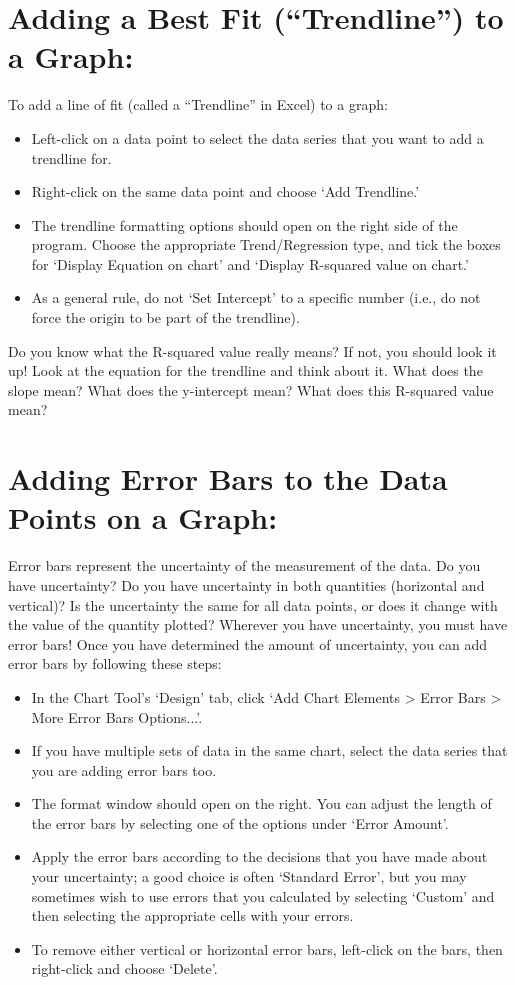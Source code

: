 \section*{Adding a Best Fit (``Trendline'') to a Graph:}
To add a line of fit (called a ``Trendline'' in Excel) to a graph:
\begin{itemize}
\itemsep-0.3em
\item Left-click on a data point to select the data series that you want to add a trendline for.
\item Right-click on the same data point and choose `Add Trendline.' 
\item The trendline formatting options should open on the right side of the program. Choose the appropriate Trend/Regression type, and tick the boxes for `Display Equation on chart' and `Display R-squared value on chart.' 
\item As a general rule, do not `Set Intercept' to a specific number (i.e., do not force the origin to be part of the trendline). 
\end{itemize}
Do you know what the R-squared value really means? 
If not, you should look it up! 
Look at the equation for the trendline and think about it. 
What does the slope mean? 
What does the y-intercept mean? What does this R-squared value mean?

\section*{Adding Error Bars to the Data Points on a Graph:}
Error bars represent the uncertainty of the measurement of the data. 
Do you have uncertainty? 
Do you have uncertainty in both quantities (horizontal and vertical)? 
Is the uncertainty the same for all data points, or does it change with the value of the quantity plotted? 
Wherever you have uncertainty, you must have error bars! 
Once you have determined the amount of uncertainty, you can add error bars by following these steps:
\begin{itemize}
\itemsep-0.3em
\item In the Chart Tool's `Design' tab, click `Add Chart Elements > Error Bars > More Error Bars Options...'. 
\item If you have multiple sets of data in the same chart, select the data series that you are adding error bars too.
\item The format window should open on the right. You can adjust the length of the error bars by selecting one of the options under `Error Amount'.
\item Apply the error bars according to the decisions that you have made about your uncertainty; a good choice is often `Standard Error', but you may sometimes wish to use errors that you calculated by selecting `Custom' and then selecting the appropriate cells with your errors. 
\item To remove either vertical or horizontal error bars, left-click on the bars, then right-click and choose `Delete'.
\end{itemize}

